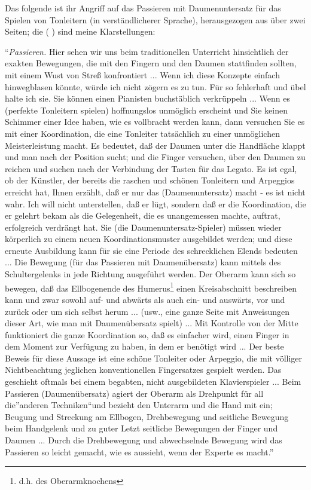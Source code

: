 Das folgende ist ihr Angriff auf das Passieren mit Daumenuntersatz für das Spielen von Tonleitern (in verständlicherer Sprache), herausgezogen aus über zwei Seiten; die ( ) sind meine Klarstellungen:

\enquote{\textit{Passieren.} Hier sehen wir uns beim traditionellen Unterricht hinsichtlich der exakten Bewegungen, die mit den Fingern und den Daumen stattfinden sollten, mit einem Wust von Streß konfrontiert ...
Wenn ich diese Konzepte einfach hinwegblasen könnte, würde ich nicht zögern es zu tun.
Für so fehlerhaft und übel halte ich sie.
Sie können einen Pianisten buchstäblich verkrüppeln ...
Wenn es (perfekte Tonleitern spielen) hoffnungslos unmöglich erscheint und Sie keinen Schimmer einer Idee haben, wie es vollbracht werden kann, dann versuchen Sie es mit einer Koordination, die eine Tonleiter tatsächlich zu einer unmöglichen Meisterleistung macht.
Es bedeutet, daß der Daumen unter die Handfläche klappt und man nach der Position sucht; und die Finger versuchen, über den Daumen zu reichen und suchen nach der Verbindung der Tasten für das Legato.
Es ist egal, ob der Künstler, der bereits die  raschen und schönen Tonleitern und Arpeggios erreicht hat, Ihnen erzählt, daß er nur das (Daumenuntersatz) macht - es ist nicht wahr.
Ich will nicht unterstellen, daß er lügt, sondern daß er die Koordination, die er gelehrt bekam als die Gelegenheit, die es unangemessen machte, auftrat, erfolgreich verdrängt hat.
Sie (die Daumenuntersatz-Spieler) müssen wieder körperlich zu einem neuen Koordinationsmuster ausgebildet werden; und diese erneute Ausbildung kann für sie eine Periode des schrecklichen Elends bedeuten ...
Die Bewegung (für das Passieren mit Daumenübersatz) kann mittels des Schultergelenks in jede Richtung ausgeführt werden.
Der Oberarm kann sich so bewegen, daß das Ellbogenende des Humerus\footnote{d.h. des Oberarmknochens} einen Kreisabschnitt beschreiben kann und zwar sowohl auf- und abwärts als auch ein- und auswärts, vor und zurück oder um sich selbst herum ... (usw., eine ganze Seite mit Anweisungen dieser Art, wie man mit Daumenübersatz spielt) ...
Mit Kontrolle von der Mitte funktioniert die ganze Koordination so, daß es einfacher wird, einen Finger in dem Moment zur Verfügung zu haben, in dem er benötigt wird ...
Der beste Beweis für diese Aussage ist eine schöne Tonleiter oder Arpeggio, die mit völliger Nichtbeachtung jeglichen konventionellen Fingersatzes gespielt werden.
Das geschieht oftmals bei einem begabten, nicht ausgebildeten Klavierspieler ...
Beim Passieren (Daumenübersatz) agiert der Oberarm als Drehpunkt für all die}anderen Techniken\enquote{und bezieht den Unterarm und die Hand mit ein; Beugung und Streckung am Ellbogen, Drehbewegung und seitliche Bewegung beim Handgelenk und zu guter Letzt seitliche Bewegungen der Finger und Daumen ...
Durch die Drehbewegung und abwechselnde Bewegung wird das Passieren so leicht gemacht, wie es aussieht, wenn der Experte es macht.}

